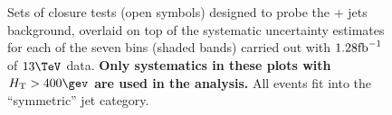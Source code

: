 \clearpage
\begin{figure}[h!]
  \begin{center}
     ~~
     \\
     ~~
     \\
    \caption{Sets of closure tests (open symbols) designed to probe
      the \znunu + jets background, overlaid on top of
      the systematic uncertainty estimates for each of the seven
      \scalht bins (shaded bands) carried out with $1.28\text{fb}^{-1}$ of
      $13\tev$ data. {\bf Only systematics in these plots with
      $\scalht>400\gev$ are used in the analysis.} All events fit 
      into the ``symmetric'' jet
      category.}
    \label{fig:ZinvclosureDataSymgt400}
  \end{center} 
\end{figure}

